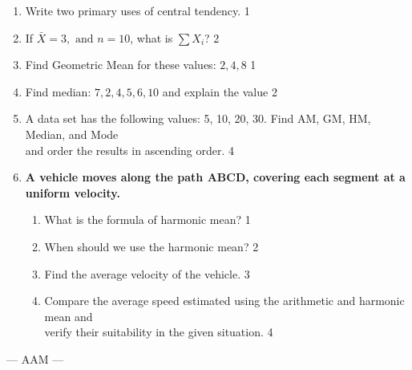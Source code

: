 \documentclass[12pt]{article}
\begin{document}
  \begin{enumerate}
  
  \item Write two primary uses of central tendency. \hfill 1
  \item If $\bar{X} = 3 , \text{ and } n = 10$, what is $\sum X_i$? \hfill 2
  \item Find Geometric Mean for these values: $2, 4, 8$ \hfill 1
  \item Find median: $7,  2,  4,  5,  6, 10$ and explain the value \hfill 2
 \item A data set has the following values: 5, 10, 20, 30. Find AM, GM, HM, Median, and Mode \\ and order the results in ascending order. \hfill 4
 \item
  \textbf{A vehicle moves along the path ABCD, covering each segment at a uniform velocity.}

\begin{center}

  \end{center}
  \begin{enumerate}
    \item
	What is the formula of harmonic mean? \hfill 1
    \item
	When should we use the harmonic mean? \hfill 2
    \item  
	Find the average velocity of the vehicle. \hfill 3
    \item
	Compare the average speed estimated using the arithmetic and harmonic mean and \\ verify their suitability in the given situation. \hfill 4
  \end{enumerate}

\end{enumerate}
\begin{center}
--- AAM ---
\end{center}
  \vspace{1cm}
  
\end{document}
